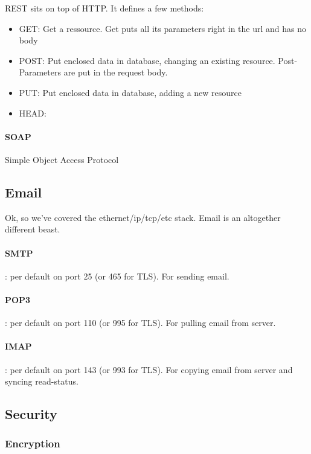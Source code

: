 REST sits on top of HTTP. It defines a few methods: 
\begin{itemize}
    \item GET: Get a ressource. Get puts all its parameters right in the url and has no body
    \item POST: Put enclosed data in database, changing an existing resource. Post-Parameters are put in the request body.
    \item PUT: Put enclosed data in database, adding a new resource
    \item HEAD: 
\end{itemize}

\paragraph{SOAP} Simple Object Access Protocol







\subsection{Email}

Ok, so we've covered the ethernet/ip/tcp/etc stack. Email is an altogether different beast. 

\paragraph{SMTP}: per default on port 25 (or 465 for TLS). For sending email.
\paragraph{POP3}: per default on port 110 (or 995 for TLS). For pulling email from server. 
\paragraph{IMAP}: per default on port 143 (or 993 for TLS). For copying email from server and syncing read-status.







\subsection{Security}

\subsubsection{Encryption}



